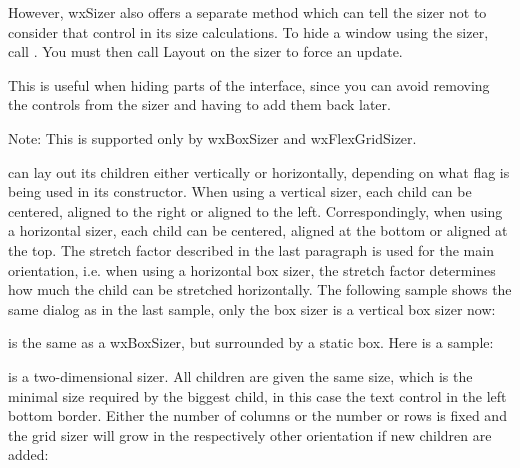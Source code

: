 However, wxSizer also offers a separate method which can tell the sizer not to 
consider that control in its size calculations.  To hide a window using the sizer,
call .  You must then call Layout on the sizer 
to force an update.

This is useful when hiding parts of the interface, since you can avoid removing
the controls from the sizer and having to add them back later.

Note: This is supported only by wxBoxSizer and wxFlexGridSizer.


 can lay out its children either vertically
or horizontally, depending on what flag is being used in its constructor.
When using a vertical sizer, each child can be centered, aligned to the
right or aligned to the left. Correspondingly, when using a horizontal
sizer, each child can be centered, aligned at the bottom or aligned at
the top. The stretch factor described in the last paragraph is used
for the main orientation, i.e. when using a horizontal box sizer, the
stretch factor determines how much the child can be stretched horizontally.
The following sample shows the same dialog as in the last sample,
only the box sizer is a vertical box sizer now:

\begin{center}
\end{center}


 is the same as a wxBoxSizer, but surrounded by a
static box. Here is a sample:

\begin{center}
\end{center}


 is a two-dimensional sizer. All children are given the
same size, which is the minimal size required by the biggest child, in
this case the text control in the left bottom border. Either the number
of columns or the number or rows is fixed and the grid sizer will grow
in the respectively other orientation if new children are added:

\begin{center}
\end{center}

